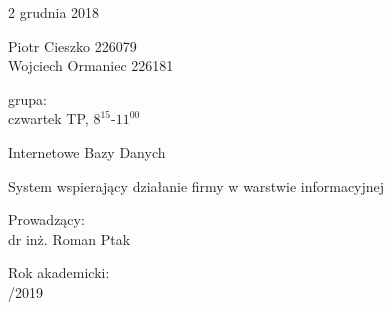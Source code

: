 \documentclass[12pt]{article}
\begin{document}
	
	\thispagestyle{empty}
	
	\begin{flushright}2 grudnia 2018\end{flushright}
	
	\noindent
	Piotr Cieszko 226079 \\
	Wojciech Ormaniec 226181 \\
	
	\vspace{1em}
	
	\noindent
	grupa: \\
	czwartek TP, $8^{15}$-$11^{00}$
	
	\vfill
	
	\begin{center}
		\begin{Large}
			Internetowe Bazy Danych
		\end{Large}
		
		\vspace{2cm}
		
		\begin{Huge}
			System wspierający działanie firmy w warstwie informacyjnej
			
		\end{Huge}
		
		\vspace{1cm}
		
		\begin{Large}
			
		\end{Large}
	\end{center}
	
	\vspace{3cm}
	
	\noindent
	\begin{Large}
		Prowadzący: \\
		\vspace{.5cm}
		\indent
		dr inż. Roman Ptak
	\end{Large}
	
	\vspace{1cm}
	
	\noindent
	\begin{Large}
		Rok akademicki: \\
		\vspace{.5cm}
		/2019
	\end{Large}
	
	\vfill
	
	\newpage
	
	\tableofcontents
	
\end{document}
